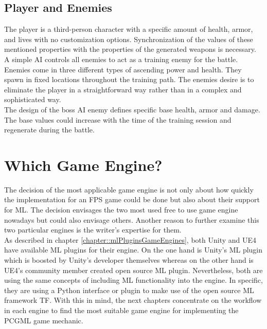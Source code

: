 \documentclass[MGS,Master,english]{twbook}%
\begin{document}
\subsection{Player and Enemies}
The player is a third-person character with a specific amount of health, armor, and lives with no customization options. Synchronization of the values of these mentioned properties with the properties of the generated weapons is necessary.\\
A simple AI controls all enemies to act as a training enemy for the battle. Enemies come in three different types of ascending power and health. They spawn in fixed locations throughout the training path. The enemies desire is to eliminate the player in a straightforward way rather than in a complex and sophisticated way. \\
The design of the boss AI enemy defines specific base health, armor and damage. The base values could increase with the time of the training session and regenerate during the battle.

\section{Which Game Engine?}
The decision of the most applicable game engine is not only about how quickly the implementation for an FPS game could be done but also about their support for ML. The decision envisages the two most used free to use game engine nowadays but could also envisage others. Another reason to further examine this two particular engines is the writer's expertise for them.\\
As described in chapter \ref{chapter::mlPluginsGameEngines}, both Unity and UE4 have available ML plugins for their engine. On the one hand is Unity's ML plugin which is boosted by Unity’s developer themselves whereas on the other hand is UE4’s community member created open source ML plugin. Nevertheless, both are using the same concepts of including ML functionality into the engine. In specific, they are using a Python interface or plugin to make use of the open source ML framework \acf{TF}. With this in mind, the next chapters concentrate on the workflow in each engine to find the most suitable game engine for implementing the PCGML game mechanic.
\end{document}
